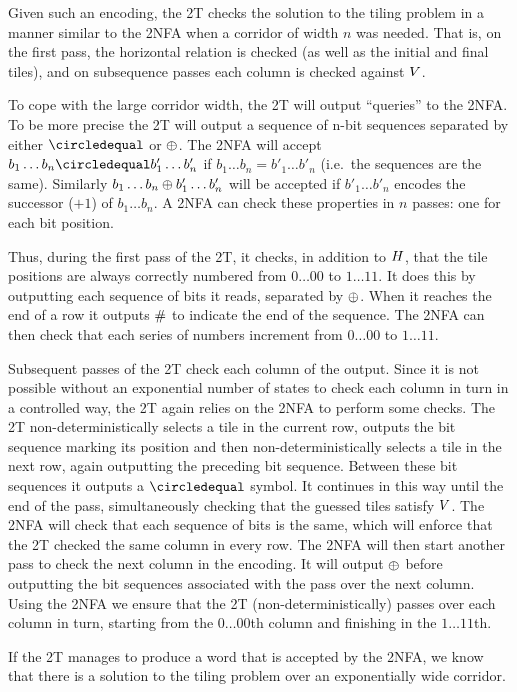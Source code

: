 Given such an encoding, the 2T checks the solution to the tiling problem in a manner similar to the 2NFA when a corridor of width $n$ was needed.
That is, on the first pass, the horizontal relation is checked (as well as the initial and final tiles), and on subsequence passes each column is checked against $V$.

To cope with the large corridor width, the 2T will output ``queries'' to the 2NFA.
To be more precise the 2T will output a sequence of n-bit sequences separated by either
$\numeq$ or $\oplus$.
The 2NFA will accept
$b_1 \ldots b_n \numeq b'_1 \ldots b'_n$
if
$b_1 \ldots b_n = b'_1 \ldots b'_n$
(i.e.~the sequences are the same).
Similarly
$b_1 \ldots b_n \oplus b'_1 \ldots b'_n$
will be accepted if 
$b'_1 \ldots b'_n$
encodes the successor ($+1$) of
$b_1 \ldots b_n$.
A 2NFA can check these properties in $n$ passes: one for each bit position.

Thus, during the first pass of the 2T, it checks, in addition to $H$, that the tile positions are always correctly numbered from $0\ldots00$ to $1\ldots11$.
It does this by outputting each sequence of bits it reads, separated by $\oplus$.
When it reaches the end of a row it outputs $\#$ to indicate the end of the sequence.
The 2NFA can then check that each series of numbers increment from $0\ldots00$ to $1\ldots11$.

Subsequent passes of the 2T check each column of the output.
Since it is not possible without an exponential number of states to check each column in turn in a controlled way, the 2T again relies on the 2NFA to perform some checks.
The 2T non-deterministically selects a tile in the current row, outputs the bit sequence marking its position and then non-deterministically selects a tile in the next row, again outputting the preceding bit sequence.
Between these bit sequences it outputs a $\numeq$ symbol.
It continues in this way until the end of the pass, simultaneously checking that the guessed tiles satisfy $V$.
The 2NFA will check that each sequence of bits is the same, which will enforce that the 2T checked the same column in every row.
The 2NFA will then start another pass to check the next column in the encoding.
It will output $\oplus$ before outputting the bit sequences associated with the pass over the next column.
Using the 2NFA we ensure that the 2T (non-deterministically) passes over each column in turn, starting from the $0\ldots00$th column and finishing in the $1\ldots11$th.

If the 2T manages to produce a word that is accepted by the 2NFA, we know that there is a solution to the tiling problem over an exponentially wide corridor.

